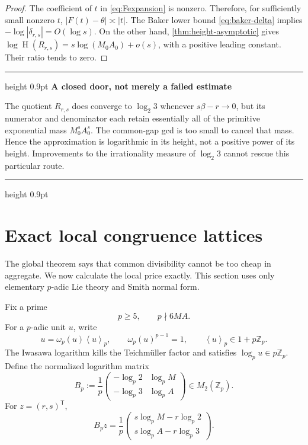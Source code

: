 \documentclass[11pt,oneside]{article}
\theoremstyle{definition}
\newenvironment{resultbox}[1]{%
  \par\medskip\noindent
  \begin{minipage}{\linewidth}
  \hrule height 0.9pt\vspace{0.5em}
  {\color{deepteal}\bfseries #1}\par\smallskip
}{%
  \vspace{0.35em}\hrule height 0.9pt
  \end{minipage}\par\medskip
}
\newcommand{\Z}{\mathbb{Z}}
\newcommand{\height}{\operatorname{H}}
\newcommand{\ang}[1]{\left\langle #1\right\rangle}
\begin{document}
\begin{proof}
The coefficient of $t$ in \eqref{eq:Fexpansion} is nonzero.  Therefore,
for sufficiently small nonzero $t$, $|F(t)-\theta|\asymp|t|$.  The Baker
lower bound \eqref{eq:baker-delta} implies
$-\log|\delta_{r,s}|=O(\log s)$.  On the other hand,
\cref{thm:height-asymptotic} gives
$\log\height(R_{r,s})=s\log(M_0A_0)+o(s)$, with a positive leading
constant.  Their ratio tends to zero.
\end{proof}

\begin{resultbox}{A closed door, not merely a failed estimate}
The quotient $R_{r,s}$ does converge to $\log_2 3$ whenever
$s\beta-r\to0$, but its numerator and denominator each retain essentially
all of the primitive exponential mass $M_0^sA_0^s$.  The common-gap gcd is
too small to cancel that mass.  Hence the approximation is logarithmic in
its height, not a positive power of its height.  Improvements to the
irrationality measure of $\log_2 3$ cannot rescue this particular route.
\end{resultbox}

\section{Exact local congruence lattices}\label{sec:smith}

The global theorem says that common divisibility cannot be too cheap in
aggregate.  We now calculate the local price exactly.  This section uses
only elementary $p$-adic Lie theory and Smith normal form.

Fix a prime
\begin{equation}\label{eq:good-prime}
  p\ge5,\qquad p\nmid6MA.
\end{equation}
For a $p$-adic unit $u$, write
\begin{equation}\label{eq:teich-split}
  u=\omega_p(u)\ang{u}_p,
  \qquad
  \omega_p(u)^{p-1}=1,
  \qquad
  \ang{u}_p\in1+p\Z_p.
\end{equation}
The Iwasawa logarithm kills the Teichm\"uller factor and satisfies
$\log_p u\in p\Z_p$.  Define the normalized logarithm matrix
\begin{equation}\label{eq:Bp}
  B_p:=\frac1p
  \begin{pmatrix}
    -\log_p2 & \log_p M\\
    -\log_p3 & \log_p A
  \end{pmatrix}
  \in M_2(\Z_p).
\end{equation}
For $z=(r,s)^{\mathsf T}$,
\begin{equation}\label{eq:Bpz}
  B_pz
  =\frac1p
  \begin{pmatrix}
     s\log_pM-r\log_p2\\
     s\log_pA-r\log_p3
  \end{pmatrix}.
\end{equation}
\end{document}
